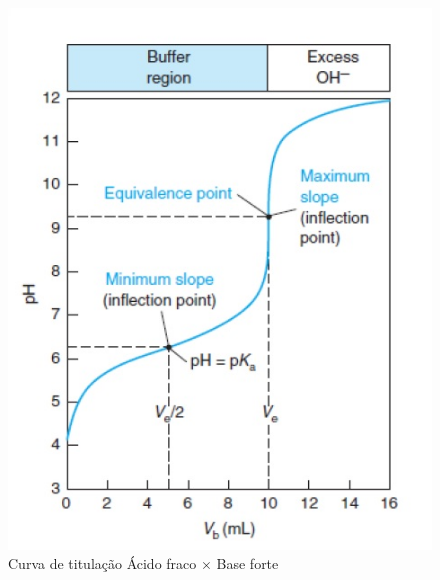 \begin{figure}[H]
\begin{center}
    \includegraphics[scale=.9]{figuras/titulacao.jpg}
\end{center}
\caption{Curva de titulação Ácido fraco $\times$ Base forte}
\label{fig:curva_titulacao}
\end{figure}

